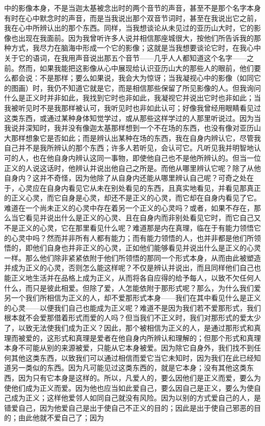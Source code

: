 中的影像本身，不是当迦太基被念出时的两个音节的声音，甚至不是那个名字本身有时在心中默念时的声音，而是当我说出那个双音节词时，甚至在我说出它之前，我在心中所辨认出的那个东西。同样，当我想谈论从未见过的亚历山大时，它的影像也出现在我面前。因为我曾听许多人说并相信那座城很大，按他们所告诉我的那种方式，我尽力在脑海中形成一个它的影像；这就是当我想要谈论它时，在我心中关于它的语词，在我用声音说出那五个音节——几乎人人都知道这个名字——之前。然而，如果我能把这影像从心中展现给认识亚历山大的那些人的眼前，他们要么都会说：不是那样；要么如果说，我会大为惊讶；当我凝视心中的影像（如同它的图画）时，我仍不知道它就是它，而是相信那些保留了所见影像的人。但我询问什么是正义时并非如此，我找到它时也非如此，我凝视它并说出它时也非如此；当我被听见时不是我那样被认可，我听见时也非如此认可；好像我曾经用眼睛看见过这类东西，或通过某种身体知觉学过，或从那些这样学过的人那里听说过。因为当我说并深知时，我并没有像迦太基那样想到一个不在场的东西，也没有像对亚历山大那样想象它是否如此；而是辨认出某种在场的东西，我在自身内辨认它，尽管我自己并不是我所辨认的那个东西；许多人若听见，会认可它。凡听见我并明智地认可的人，也在他自身内辨认这同一事物，即使他自己也不是他所辨认的。但当一位正义的人说这话时，他辨认并说出他自己之所是。而他从哪里辨认它呢？除了从他自身内？这并不奇怪，因为他除了从自身内还能从哪里辨认自己呢？可奇之处在于，心灵应在自身内看见它从未在别处看见的东西，且真实地看见，并看见那真正的正义心灵，而它自身是心灵，却还不是正义的心灵，而它却在自身内看见了它。难道在一个尚未正义的心灵中存在着另一个正义的心灵吗？或者，如果不存在，那么当它看见并说出什么是正义的心灵、且在自身内而非别处看见它时，而它自己又不是正义的心灵，它在那里看见什么呢？难道那是内在真理，临在于有能力领悟它的心灵中吗？然而并非所有人都有能力；而有能力领悟的人，也并非都是他们所领悟的，即他们自身也并非正义的心灵，正如他们能够看见并说出什么是正义的心灵一样。那么他们除非紧紧依附于他们所领悟的那同一个形式本身，从而由此被塑造并成为正义的心灵，否则怎么能这样呢？不仅是辨认并说出，而且同样他们自己也能正义地生活并在品格上成为正义，从而将各自应得的给予每人，以致不欠任何人什么，而只是彼此相爱。但除了爱，人怎能依附于那形式呢？那么，为什么我们爱另一个我们所相信为正义的人，却不爱那形式本身——我们在其中看见什么是正义的心灵——以便我们自己也能成为正义呢？难道不是因为我们若不爱那形式，我们根本就不会爱那借着形式而爱的人吗？但当我们不正义时，我们对那形式的爱太少了，以致无法使我们成为正义？因此，那个被相信为正义的人，是通过那形式和真理而被爱的，这形式和真理是爱者在他自身内所辨认和理解的；但那个形式和真理本身不可能从别的来源被爱，只能从它本身被爱。因为除它自身外，我们找不到任何其他这类东西，以致我们可以通过相信而爱它当它未知时，因为我们在此已经知道另一类似的东西。因为凡可能见过这类东西的，就是它本身；没有其他这类东西，因为只有它本身是这样的。所以，凡爱人的，要么因他们是正义而爱，要么为使他们成为正义而爱。因为他也应当如此爱自己，要么因自己是正义，要么为使自己成为正义；这样他爱邻人如同自己就没有风险。因为以别的方式爱自己的人，是错爱自己，因为他爱自己是出于使自己不正义的目的；因此是出于使自己邪恶的目的；由此他就不爱自己了；因为\par


